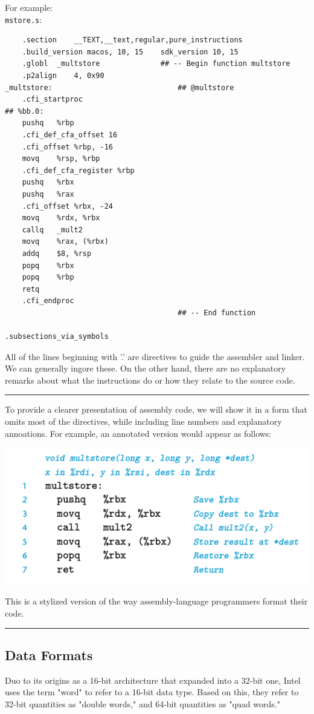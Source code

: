 \documentclass[11pt]{article}
\begin{document}
For example:\\
\texttt{mstore.s}:\\
\begin{verbatim}
	.section	__TEXT,__text,regular,pure_instructions
	.build_version macos, 10, 15	sdk_version 10, 15
	.globl	_multstore              ## -- Begin function multstore
	.p2align	4, 0x90
_multstore:                             ## @multstore
	.cfi_startproc
## %bb.0:
	pushq	%rbp
	.cfi_def_cfa_offset 16
	.cfi_offset %rbp, -16
	movq	%rsp, %rbp
	.cfi_def_cfa_register %rbp
	pushq	%rbx
	pushq	%rax
	.cfi_offset %rbx, -24
	movq	%rdx, %rbx
	callq	_mult2
	movq	%rax, (%rbx)
	addq	$8, %rsp
	popq	%rbx
	popq	%rbp
	retq
	.cfi_endproc
                                        ## -- End function

.subsections_via_symbols
\end{verbatim}

All of the lines beginning with '.' are directives to guide the assembler and linker. We can generally ingore these. On the other hand, there are no explanatory remarks about what the instructions do or how they relate to the source code.\\


\noindent\rule{\textwidth}{0.5pt}
To provide a clearer presentation of assembly code, we will show it in a form that omits most of the directives, while including line numbers and explanatory annoations. For example, an annotated version would appear as follows:\\

\begin{center}
\includegraphics[width=.9\linewidth]{pics/annotated-version-assembly-code.png}
\end{center}


This is a stylized version of the way assembly-language programmers format their code.\\

\noindent\rule{\textwidth}{0.5pt}

\subsection{Data Formats}
\label{sec:orgcb3f55b}
Duo to its origins as a 16-bit architecture that expanded into a 32-bit one, Intel uses the term "word" to refer to a 16-bit data type. Based on this, they refer to 32-bit quantities as "double words," and 64-bit quantities as "quad words."\\
\end{document}
